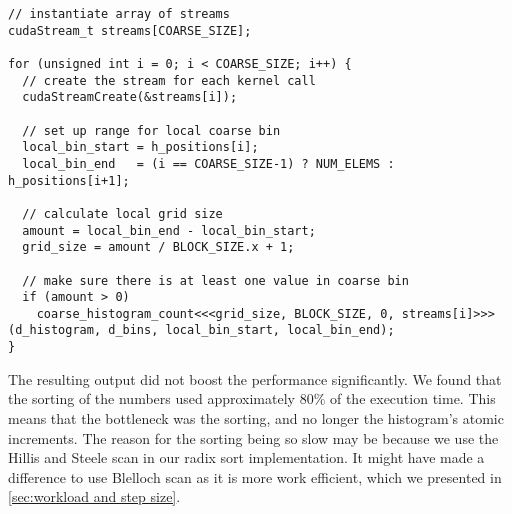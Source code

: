 \begin{lstlisting}[caption={Using streams to invoke kernels concurrently}, label={lst:coarse histo streams}]
// instantiate array of streams
cudaStream_t streams[COARSE_SIZE];

for (unsigned int i = 0; i < COARSE_SIZE; i++) {
  // create the stream for each kernel call
  cudaStreamCreate(&streams[i]);

  // set up range for local coarse bin
  local_bin_start = h_positions[i];
  local_bin_end   = (i == COARSE_SIZE-1) ? NUM_ELEMS : h_positions[i+1];

  // calculate local grid size
  amount = local_bin_end - local_bin_start;
  grid_size = amount / BLOCK_SIZE.x + 1;

  // make sure there is at least one value in coarse bin
  if (amount > 0)
    coarse_histogram_count<<<grid_size, BLOCK_SIZE, 0, streams[i]>>>(d_histogram, d_bins, local_bin_start, local_bin_end);
}
\end{lstlisting}


The resulting output did not boost the performance significantly.
We found that the sorting of the numbers used approximately $80\%$ of the execution time.
This means that the bottleneck was the sorting, and no longer the histogram's atomic increments.
The reason for the sorting being so slow may be because we use the Hillis and Steele scan in our radix sort implementation.
It might have made a difference to use Blelloch scan as it is more work efficient, which we presented in \cref{sec:workload and step size}.
